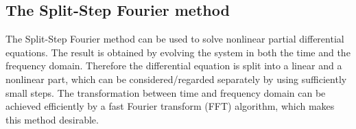 \subsection{The Split-Step Fourier method}

The Split-Step Fourier method can be used to solve nonlinear partial differential equations. The result is obtained by evolving the system in both the time and the frequency domain. Therefore the differential equation is split into a linear and a nonlinear part, which can be considered/regarded separately by using sufficiently small steps. The transformation between time and frequency domain can be achieved efficiently by a fast Fourier transform (FFT) algorithm, which makes this method desirable.


